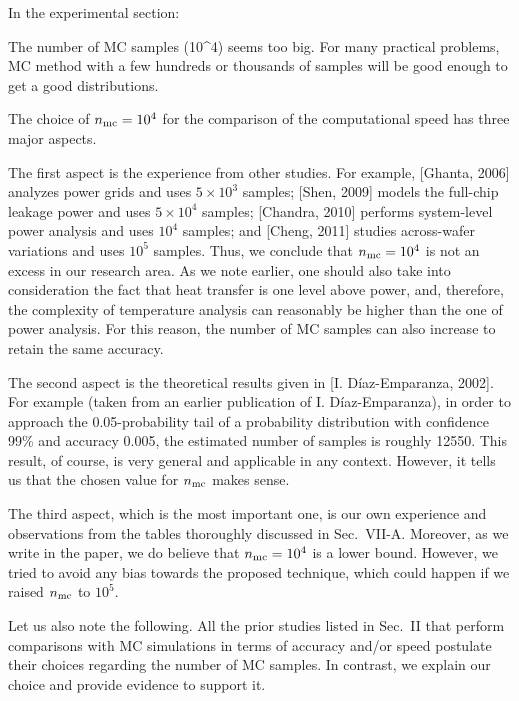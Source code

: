 \begin{reviewer}
In the experimental section:

The number of MC samples (10\^{}4) seems too big. For many practical problems, MC method with a few hundreds or thousands of samples will be good enough to get a good distributions.
\end{reviewer}
\begin{authors}
The choice of ${n_\text{mc}} = 10^4$ for the comparison of the computational speed has three major aspects.

The first aspect is the experience from other studies.
For example, [Ghanta, 2006] analyzes power grids and uses $5 \times 10^3$ samples; [Shen, 2009] models the full-chip leakage power and uses $5 \times 10^4$ samples; [Chandra, 2010] performs system-level power analysis and uses $10^4$ samples; and [Cheng, 2011] studies across-wafer variations and uses $10^5$ samples.
Thus, we conclude that ${n_\text{mc}} = 10^4$ is not an excess in our research area.
As we note earlier, one should also take into consideration the fact that heat transfer is one level above power, and, therefore, the complexity of temperature analysis can reasonably be higher than the one of power analysis.
For this reason, the number of MC samples can also increase to retain the same accuracy.

The second aspect is the theoretical results given in [I. D\'{i}az-Emparanza, 2002].
For example (taken from an earlier publication of I. D\'{i}az-Emparanza), in order to approach the 0.05-probability tail of a probability distribution with confidence 99\% and accuracy 0.005, the estimated number of samples is roughly 12550.
This result, of course, is very general and applicable in any context.
However, it tells us that the chosen value for ${n_\text{mc}}$ makes sense.

The third aspect, which is the most important one, is our own experience and observations from the tables thoroughly discussed in Sec.~VII-A.
Moreover, as we write in the paper, we do believe that ${n_\text{mc}} = 10^4$ is a lower bound.
However, we tried to avoid any bias towards the proposed technique, which could happen if we raised ${n_\text{mc}}$ to $10^5$.

Let us also note the following.
All the prior studies listed in Sec.~II that perform comparisons with MC simulations in terms of accuracy and/or speed postulate their choices regarding the number of MC samples.
In contrast, we explain our choice and provide evidence to support it.

\end{authors}

